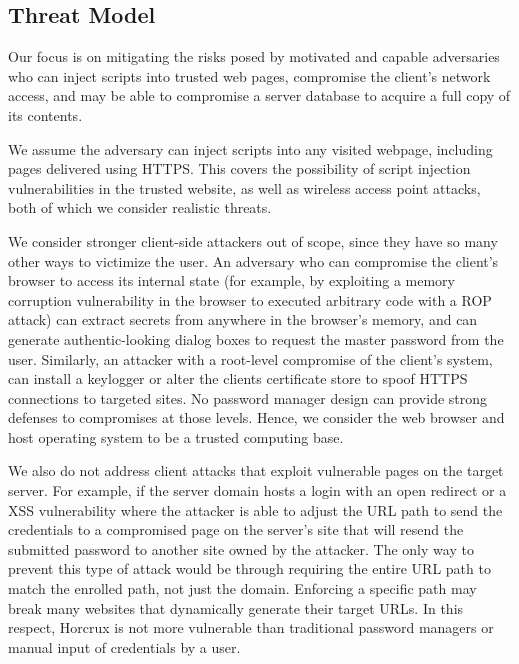 
\subsection{Threat Model}\label{sec:threat_model}

Our focus is on mitigating the risks posed by motivated and capable adversaries who can inject scripts into trusted web pages, compromise the client's network access, and may be able to compromise a server database to acquire a full copy of its contents.

 We assume the adversary can inject scripts into any visited webpage, including pages delivered using HTTPS. This covers the possibility of script injection vulnerabilities in the trusted website, as well as wireless access point attacks, both of which we consider realistic threats. 

We consider stronger client-side attackers out of scope, since they have so many other ways to victimize the user.  An adversary who can compromise the client's browser to access its internal state (for example, by exploiting a memory corruption vulnerability in the browser to executed arbitrary code with a ROP attack) can extract secrets from anywhere in the browser's memory, and can generate authentic-looking dialog boxes to request the master password from the user.  Similarly, an attacker with a root-level compromise of the client's system, can install a keylogger or alter the clients certificate store to spoof HTTPS connections to targeted sites.  No password manager design can provide strong defenses to compromises at those levels. Hence, we consider the web browser and host operating system to be a trusted computing base.  

We also do not address client attacks that exploit vulnerable pages on the target server. For example, if the server domain hosts a login with an open redirect or a XSS vulnerability where the attacker is able to adjust the URL path to send the credentials to a compromised page on the server's site that will resend the submitted password to another site owned by the attacker. The only way to prevent this type of attack would be through requiring the entire URL path to match the enrolled path, not just the domain. Enforcing a specific path may break many websites that dynamically generate their target URLs. In this respect, Horcrux is not more vulnerable than traditional password managers or manual input of credentials by a user.  

